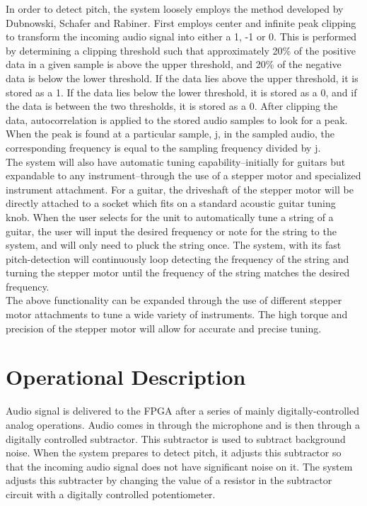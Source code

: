 \documentclass[aps,letterpaper,10pt]{revtex4}
\begin{document}
In order to detect pitch, the system loosely employs the method developed by Dubnowski, Schafer and Rabiner. First employs center and infinite peak clipping to transform the incoming audio signal into either a 1, -1 or 0. This is performed by determining a clipping threshold such that approximately 20\% of the positive data in a given sample is above the upper threshold, and 20\% of the negative data is below the lower threshold. If the data lies above the upper threshold, it is stored as a 1. If the data lies below the lower threshold, it is stored as a 0, and if the data is between the two thresholds, it is stored as a 0. After clipping the data, autocorrelation is applied to the stored audio samples to look for a peak. When the peak is found at a particular sample, j, in the sampled audio, the corresponding frequency is equal to the sampling frequency divided by j.\\

The system will also have automatic tuning capability--initially for guitars but expandable to any instrument--through the use of a stepper motor and specialized instrument attachment. For a guitar, the driveshaft of the stepper motor will be directly attached to a socket which fits on a standard acoustic guitar tuning knob. When the user selects for the unit to automatically tune a string of a guitar, the user will input the desired frequency or note for the string to the system, and will only need to pluck the string once. The system, with its fast pitch-detection will continuously loop detecting the frequency of the string and turning the stepper motor until the frequency of the string matches the desired frequency.\\ 

The above functionality can be expanded through the use of different stepper motor attachments to tune a wide variety of instruments. The high torque and precision of the stepper motor will allow for accurate and precise tuning.

\section{Operational Description}
Audio signal is delivered to the FPGA after a series of mainly digitally-controlled analog operations. Audio comes in through the microphone and is then through a digitally controlled subtractor. This subtractor is used to subtract background noise. When the system prepares to detect pitch, it adjusts this subtractor so that the incoming audio signal does not have significant noise on it. The system adjusts this subtracter by changing the value of a resistor in the subtractor circuit with a digitally controlled potentiometer.\\
\end{document}
